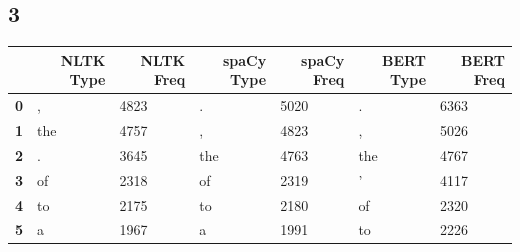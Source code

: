 \documentclass[8pt,a4paper]{report}%
\begin{document}
\subsection*{3}

\begin{table}[H]
\begin{tabular}{|c|l|l|l|l|l|l|}
\hline
\multicolumn{1}{|r|}{\textbf{}} & \multicolumn{1}{r|}{\textbf{NLTK Type}} & \multicolumn{1}{r|}{\textbf{NLTK Freq}} & \multicolumn{1}{r|}{\textbf{spaCy Type}} & \multicolumn{1}{r|}{\textbf{spaCy Freq}} & \multicolumn{1}{r|}{\textbf{BERT Type}} & \multicolumn{1}{r|}{\textbf{BERT Freq}} \\ \hline
\textbf{0}                      & ,                                       & 4823                                    & .                                        & 5020                                     & .                                       & 6363                                    \\ \hline
\textbf{1}                      & the                                     & 4757                                    & ,                                        & 4823                                     & ,                                       & 5026                                    \\ \hline
\textbf{2}                      & .                                       & 3645                                    & the                                      & 4763                                     & the                                     & 4767                                    \\ \hline
\textbf{3}                      & of                                      & 2318                                    & of                                       & 2319                                     & '                                       & 4117                                    \\ \hline
\textbf{4}                      & to                                      & 2175                                    & to                                       & 2180                                     & of                                      & 2320                                    \\ \hline
\textbf{5}                      & a                                       & 1967                                    & a                                        & 1991                                     & to                                      & 2226                                    \\ \hline

\end{tabular}
\end{table}
\end{document}
